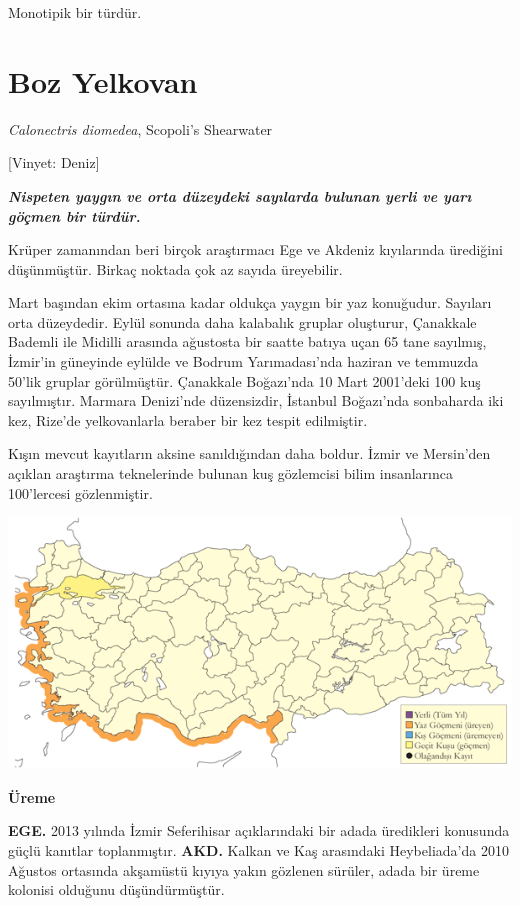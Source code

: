 \documentclass[
  letterpaper,
  DIV=11,
  numbers=noendperiod]{scrreprt}
\begin{document}
Monotipik bir türdür.

\section{Boz Yelkovan}\label{boz-yelkovan}

\emph{Calonectris diomedea}, Scopoli's Shearwater

{[}Vinyet: Deniz{]}

\textbf{\emph{Nispeten yaygın ve orta düzeydeki sayılarda bulunan yerli
ve yarı göçmen bir türdür.}}

Krüper zamanından beri birçok araştırmacı Ege ve Akdeniz kıyılarında
ürediğini düşünmüştür. Birkaç noktada çok az sayıda üreyebilir.

Mart başından ekim ortasına kadar oldukça yaygın bir yaz konuğudur.
Sayıları orta düzeydedir. Eylül sonunda daha kalabalık gruplar
oluşturur, Çanakkale Bademli ile Midilli arasında ağustosta bir saatte
batıya uçan 65 tane sayılmış, İzmir'in güneyinde eylülde ve Bodrum
Yarımadası'nda haziran ve temmuzda 50'lik gruplar görülmüştür. Çanakkale
Boğazı'nda 10 Mart 2001'deki 100 kuş sayılmıştır. Marmara Denizi'nde
düzensizdir, İstanbul Boğazı'nda sonbaharda iki kez, Rize'de
yelkovanlarla beraber bir kez tespit edilmiştir.

Kışın mevcut kayıtların aksine sanıldığından daha boldur. İzmir ve
Mersin'den açıklan araştırma teknelerinde bulunan kuş gözlemcisi bilim
insanlarınca 100'lercesi gözlenmiştir.

\includegraphics{images/harita_Page_048.png}

\textbf{Üreme}

\textbf{EGE.} 2013 yılında İzmir Seferihisar açıklarındaki bir adada
üredikleri konusunda güçlü kanıtlar toplanmıştır. \textbf{AKD.} Kalkan
ve Kaş arasındaki Heybeliada'da 2010 Ağustos ortasında akşamüstü kıyıya
yakın gözlenen sürüler, adada bir üreme kolonisi olduğunu
düşündürmüştür.
\end{document}
